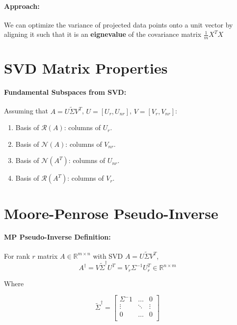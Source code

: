 \documentclass[a4paper,12pt]{report}
\def\reals{\mathbb{R}}
\begin{document}
\paragraph{Approach: } We can optimize the variance of projected data points onto a unit vector by aligning it such that it is an \textbf{eignevalue} of the covariance matrix $\frac{1}{m} X^TX$



\section{SVD Matrix Properties}

\paragraph{Fundamental Subspaces from SVD: } Assuming that $A = U\tilde{\Sigma}V^T$, $U = [U_r, U_{nr}]$, $V = [V_r, V_{nr}]$: 
\begin{enumerate}
\item Basis of $\mathcal{R}(A)$: columns of $U_r$.
\item Basis of $\mathcal{N}(A)$: columns of $V_{nr}$.
\item Basis of $\mathcal{N}(A^T)$: columns of $U_{nr}$.
\item Basis of $\mathcal{R}(A^T)$: columns of $V_r$.
\end{enumerate}

\section{Moore-Penrose Pseudo-Inverse}

\paragraph{MP Pseudo-Inverse Definition: } For rank $r$ matrix $A\in \reals^{m\times n}$ with SVD $A = U\tilde{\Sigma}V^T$, 
\begin{equation}
	A^\dagger = V\tilde{\Sigma}^\dagger U^T = V_r\Sigma^{-1}U_r^T \in \reals^{n\times m}
\end{equation}

Where 

\begin{equation}
\tilde{\Sigma}^\dagger = 
\begin{bmatrix}
	\Sigma^-1 & \dots & 0 \\
	\vdots & \ddots & \vdots \\
	0 & \dots & 0 \\
\end{bmatrix}
\end{equation}
\end{document}
